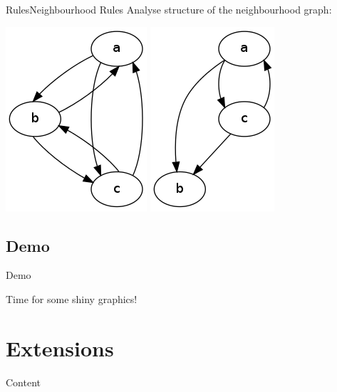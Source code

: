 \documentclass{beamer}
\newcommand{\tocsection}[1]{
  \section{#1}
  \begin{frame}{Content}
    \tableofcontents[sectionstyle=show/shaded,subsectionstyle=show/show/hide]
  \end{frame}
 }
\begin{document}
\begin{frame}{Rules}{Neighbourhood Rules}
Analyse structure of the neighbourhood graph:
\begin{center}
\includegraphics[width=.3\textwidth]{neighbourhood1}\hspace{1cm}
\includegraphics[width=.3\textwidth]{neighbourhood2}
\end{center}
\end{frame}

\subsection{Demo}
\begin{frame}{Demo}
\begin{center}
	\huge{Time for some shiny graphics!}
\end{center}
\end{frame}

\tocsection{Extensions}
\end{document}
